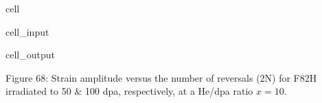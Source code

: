 \documentclass[letterpaper,10pt,english]{jupyterBook}
\begin{document}
\begin{sphinxuseclass}{cell}
\begin{sphinxVerbatimInput}
\begin{sphinxuseclass}{cell_input}
		\end{sphinxuseclass}\end{sphinxVerbatimInput}
		\begin{sphinxVerbatimOutput}
			
			\begin{sphinxuseclass}{cell_output}
				\noindent{}
				
				\noindent{}
				
		\end{sphinxuseclass}\end{sphinxVerbatimOutput}
		
	\end{sphinxuseclass}
	\sphinxAtStartPar
	Figure 68: Strain amplitude versus the number of reversals (2N) for F82H irradiated to 50 \& 100 dpa, respectively, at a He/dpa ratio \(x = 10\).
	
	
	
	
	
	
	
	\renewcommand{\indexname}{Index}
	\printindex
\end{document}
